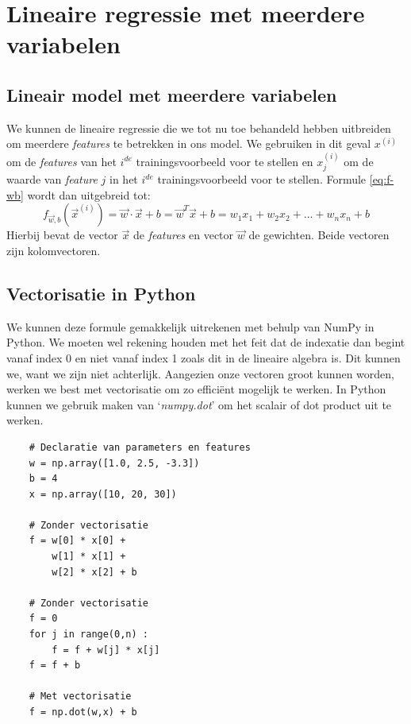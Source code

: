 \section{Lineaire regressie met meerdere variabelen}

\subsection{Lineair model met meerdere variabelen}
We kunnen de lineaire regressie die we tot nu toe behandeld hebben uitbreiden om meerdere \textit{features} te betrekken in ons model. We gebruiken in dit geval $x^{(i)}$ om de \textit{features} van het $i^{de}$ trainingsvoorbeeld voor te stellen en $x^{(i)}_{j}$ om de waarde van \textit{feature} $j$ in het $i^{de}$ trainingsvoorbeeld voor te stellen. Formule \ref{eq:f-wb} wordt dan uitgebreid tot:
\begin{equation}
	f_{\vec{w},b}(\vec{x}^{(i)}) = \vec{w} \cdot \vec{x} + b = \vec{w}^{T} \vec{x} + b = w_{1}x_{1} + w_{2}x_{2} + ... + w_{n}x_{n} + b
	\label{eq:f-wb-multi}
\end{equation}
\noindent
Hierbij bevat de vector $\vec{x}$ de \textit{features} en vector $\vec{w}$ de gewichten. Beide vectoren zijn kolomvectoren. 

\subsection{Vectorisatie in Python}

We kunnen deze formule gemakkelijk uitrekenen met behulp van NumPy in Python. We moeten wel rekening houden met het feit dat de indexatie dan begint vanaf index 0 en niet vanaf index 1 zoals dit in de lineaire algebra is. Dit kunnen we, want we zijn niet achterlijk. Aangezien onze vectoren groot kunnen worden, werken we best met vectorisatie om zo efficiënt mogelijk te werken. In Python kunnen we gebruik maken van `\textit{numpy.dot}' om het scalair of dot product uit te werken. \\

\begin{lstlisting}
	# Declaratie van parameters en features
	w = np.array([1.0, 2.5, -3.3])
	b = 4
	x = np.array([10, 20, 30])
	
	# Zonder vectorisatie
	f = w[0] * x[0] + 
	    w[1] * x[1] + 
	    w[2] * x[2] + b
	
	# Zonder vectorisatie
	f = 0
	for j in range(0,n) : 
	    f = f + w[j] * x[j]
	f = f + b
	
	# Met vectorisatie
	f = np.dot(w,x) + b
\end{lstlisting}

